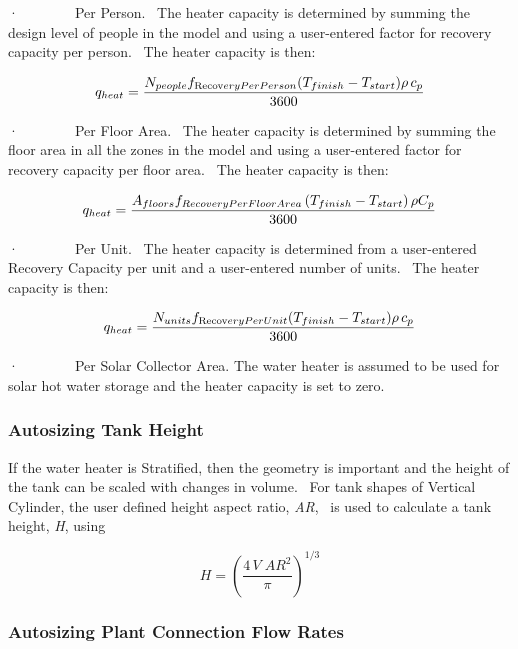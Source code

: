 ·~~~~~~~~Per Person.~ The heater capacity is determined by summing the design level of people in the model and using a user-entered factor for recovery capacity per person.~ The heater capacity is then:

\begin{equation}
{q_{heat}} = \frac{{{N_{people}}{f_{{\mathop{\rm Re}\nolimits} {\mathop{\rm cov}} eryPerPerson}}({T_{finish}} - {T_{start}})\rho \,{c_p}}}{{3600}}
\end{equation}

·~~~~~~~~Per Floor Area.~ The heater capacity is determined by summing the floor area in all the zones in the model and using a user-entered factor for recovery capacity per floor area.~ The heater capacity is then:

\begin{equation}
  q_{heat} = \frac{A_{floors}f_{RecoveryPerFloorArea}\left(T_{finish} - T_{start}\right)\rho C_p}{3600}
\end{equation}

·~~~~~~~~Per Unit.~ The heater capacity is determined from a user-entered Recovery Capacity per unit and a user-entered number of units.~ The heater capacity is then:

\begin{equation}
{q_{heat}} = \frac{{{N_{units}}{f_{{\mathop{\rm Re}\nolimits} {\mathop{\rm cov}} eryPerUnit}}({T_{finish}} - {T_{start}})\rho \,{c_p}}}{{3600}}
\end{equation}

·~~~~~~~~Per Solar Collector Area. The water heater is assumed to be used for solar hot water storage and the heater capacity is set to zero.

\subsubsection{Autosizing Tank Height}\label{autosizing-tank-height}

If the water heater is Stratified, then the geometry is important and the height of the tank can be scaled with changes in volume.~ For tank shapes of Vertical Cylinder, the user defined height aspect ratio, \emph{AR},~ is used to calculate a tank height, \emph{H}, using

\begin{equation}
H = {\left( {\frac{{4\,V\;A{R^2}}}{\pi }} \right)^{1/3}}
\end{equation}

\subsubsection{Autosizing Plant Connection Flow Rates}\label{autosizing-plant-connection-flow-rates}

